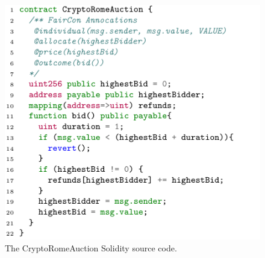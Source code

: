 \begin{figure}[t]
	\centering
	\includegraphics[width=.9\columnwidth]{Figures/Chapter2/auction.pdf}
	\caption{The CryptoRomeAuction Solidity source code.}\label{CryptoRomeAuction}
\end{figure}


